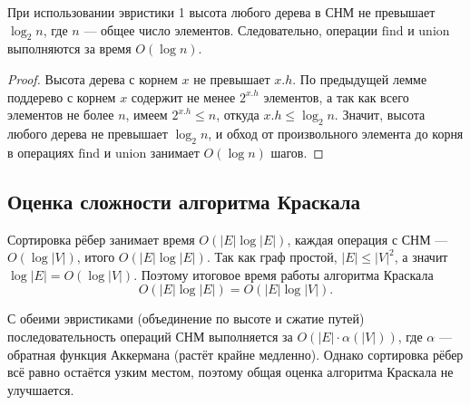 \begin{Theorem}{}{}
	При использовании эвристики 1 высота любого дерева в СНМ не превышает $\log_2 n$, где $n$ --- общее число элементов. Следовательно, операции $\mathrm{find}$ и $\mathrm{union}$ выполняются за время $O(\log n)$.
\end{Theorem}

\begin{proof}
	Высота дерева с корнем $x$ не превышает $x.h$. По предыдущей лемме поддерево с корнем $x$ содержит не менее $2^{x.h}$ элементов, а так как всего элементов не более $n$, имеем $2^{x.h} \leq n$, откуда $x.h \leq \log_2 n$. Значит, высота любого дерева не превышает $\log_2 n$, и обход от произвольного элемента до корня в операциях $\mathrm{find}$ и $\mathrm{union}$ занимает $O(\log n)$ шагов.
\end{proof}

\subsection{Оценка сложности алгоритма Краскала}

\begin{Remark}{}{}
	Сортировка рёбер занимает время $O(|E| \log |E|)$, каждая операция с СНМ --- $O(\log |V|)$, итого $O(|E| \log |E|)$. Так как граф простой, $|E| \leq |V|^2$, а значит $\log |E| = O(\log |V|)$. Поэтому итоговое время работы алгоритма Краскала
	\[
	O(|E| \log |E|) = O(|E| \log |V|).
	\]
\end{Remark}

\begin{Remark}{}{}
	С обеими эвристиками (объединение по высоте и сжатие путей) последовательность операций СНМ выполняется за $O(|E| \cdot \alpha(|V|))$, где $\alpha$ --- обратная функция Аккермана (растёт крайне медленно). Однако сортировка рёбер всё равно остаётся узким местом, поэтому общая оценка алгоритма Краскала не улучшается.
\end{Remark}